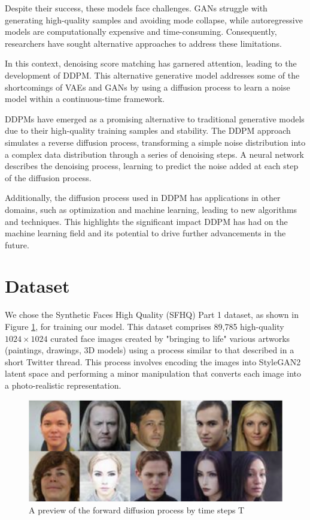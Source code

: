 \documentclass[letterpaper]{article} %
\begin{document}
Despite their success, these models face challenges. GANs struggle with generating high-quality samples and avoiding mode collapse, while autoregressive models are computationally expensive and time-consuming. Consequently, researchers have sought alternative approaches to address these limitations.

In this context, denoising score matching has garnered attention, leading to the development of DDPM. This alternative generative model addresses some of the shortcomings of VAEs and GANs by using a diffusion process to learn a noise model within a continuous-time framework.

DDPMs have emerged as a promising alternative to traditional generative models due to their high-quality training samples and stability. The DDPM approach simulates a reverse diffusion process, transforming a simple noise distribution into a complex data distribution through a series of denoising steps. A neural network describes the denoising process, learning to predict the noise added at each step of the diffusion process.

Additionally, the diffusion process used in DDPM has applications in other domains, such as optimization and machine learning, leading to new algorithms and techniques. This highlights the significant impact DDPM has had on the machine learning field and its potential to drive further advancements in the future.

\section{Dataset}
We chose the Synthetic Faces High Quality (SFHQ) Part 1 dataset, as shown in Figure \ref{fig:figure5}, for training our model. This dataset comprises 89,785 high-quality $1024 \times 1024$ curated face images created by "bringing to life" various artworks (paintings, drawings, 3D models) using a process similar to that described in a short Twitter thread. This process involves encoding the images into StyleGAN2 latent space and performing a minor manipulation that converts each image into a photo-realistic representation.

\begin{figure}[htbp]
\centering
\includegraphics[width=0.88\linewidth]{f5.png} %
\caption{A preview of the forward diffusion process by time steps T}
\label{fig:figure5}
\end{figure}
\end{document}
